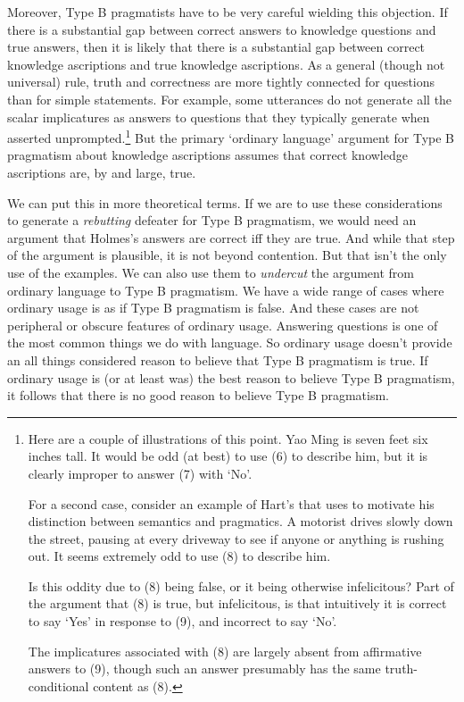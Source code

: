 Moreover, Type B pragmatists have to be very careful wielding this objection. If there is a substantial gap between correct answers to knowledge questions and true answers, then it is likely that there is a substantial gap between correct knowledge ascriptions and true knowledge ascriptions. As a general (though not universal) rule, truth and correctness are more tightly connected for questions than for simple statements. For example, some utterances do not generate all the scalar implicatures as answers to questions that they typically generate when asserted unprompted.\footnote{Here are a couple of illustrations of this point. Yao Ming is seven feet six inches tall. It would be odd (at best) to use (6) to describe him, but it is clearly improper to answer (7) with `No'. \par \noindent For a second case, consider an example of Hart's that \citet{Grice1989} uses to motivate his distinction between semantics and pragmatics. A motorist drives slowly down the street, pausing at every driveway to see if anyone or anything is rushing out. It seems extremely odd to use (8) to describe him. \par \noindent Is this oddity due to (8) being false, or it being otherwise infelicitous? Part of the argument that (8) is true, but infelicitous, is that intuitively it is correct to say `Yes' in response to (9), and incorrect to say `No'.\par \noindent The implicatures associated with (8) are largely absent from affirmative answers to (9), though such an answer presumably has the same truth-conditional content as (8).} But the primary `ordinary language' argument for Type B pragmatism about knowledge ascriptions assumes that correct knowledge ascriptions are, by and large, true.

We can put this in more theoretical terms. If we are to use these considerations to generate a \textit{rebutting} defeater for Type B pragmatism, we would need an argument that Holmes's answers are correct iff they are true. And while that step of the argument is plausible, it is not beyond contention. But that isn't the only use of the examples. We can also use them to \textit{undercut} the argument from ordinary language to Type B pragmatism. We have a wide range of cases where ordinary usage is as if Type B pragmatism is false. And these cases are not peripheral or obscure features of ordinary usage. Answering questions is one of the most common things we do with language. So ordinary usage doesn't provide an all things considered reason to believe that Type B pragmatism is true. If ordinary usage is (or at least was) the best reason to believe Type B pragmatism, it follows that there is no good reason to believe Type B pragmatism.

